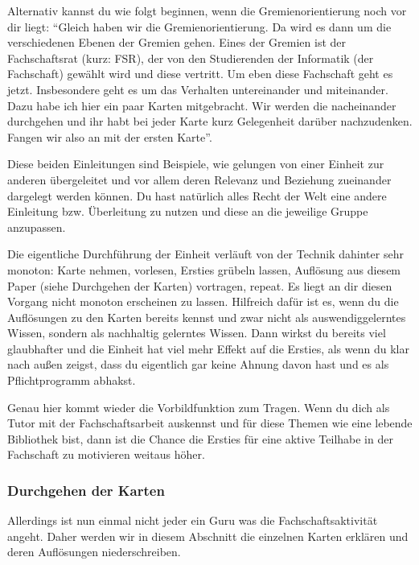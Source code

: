 \documentclass[a4paper,11pt]{scrartcl} %
\begin{document}
Alternativ kannst du wie folgt beginnen, wenn die Gremienorientierung noch vor dir liegt: "`Gleich haben wir die Gremienorientierung. Da wird es dann um die verschiedenen Ebenen der Gremien gehen. Eines der Gremien ist der Fachschaftsrat (kurz: FSR), der von den Studierenden der Informatik (der Fachschaft) gewählt wird und diese vertritt. Um eben diese Fachschaft geht es jetzt.
Insbesondere geht es um das Verhalten untereinander und miteinander. Dazu habe ich hier ein paar Karten mitgebracht. Wir werden die nacheinander durchgehen und ihr habt bei jeder Karte kurz Gelegenheit darüber nachzudenken. Fangen wir also an mit der ersten Karte"'.

Diese beiden Einleitungen sind Beispiele, wie gelungen von einer Einheit zur anderen übergeleitet und vor allem deren Relevanz und Beziehung zueinander dargelegt werden können. Du hast natürlich alles Recht der Welt eine andere Einleitung bzw. Überleitung zu nutzen und diese an die jeweilige Gruppe anzupassen.

Die eigentliche Durchführung der Einheit verläuft von der Technik dahinter sehr monoton: Karte nehmen, vorlesen, Ersties grübeln lassen, Auflösung aus diesem Paper (siehe Durchgehen der Karten) vortragen, repeat.
Es liegt an dir diesen Vorgang nicht monoton erscheinen zu lassen. Hilfreich dafür ist es, wenn du die Auflösungen zu den Karten bereits kennst und zwar nicht als auswendiggelerntes Wissen, sondern als nachhaltig gelerntes Wissen. Dann wirkst du bereits viel glaubhafter und die Einheit hat viel mehr Effekt auf die Ersties, als wenn du klar nach außen zeigst, dass du eigentlich gar keine Ahnung davon hast und es als Pflichtprogramm abhakst.

Genau hier kommt wieder die Vorbildfunktion zum Tragen. Wenn du dich als Tutor mit der Fachschaftsarbeit auskennst und für diese Themen wie eine lebende Bibliothek bist, dann ist die Chance die Ersties für eine aktive Teilhabe in der Fachschaft zu motivieren weitaus höher.

	\subsubsection{Durchgehen der Karten}
	
	Allerdings ist nun einmal nicht jeder ein Guru was die Fachschaftsaktivität angeht. Daher werden wir in diesem Abschnitt die einzelnen Karten erklären und deren Auflösungen niederschreiben.
	
\end{document}
